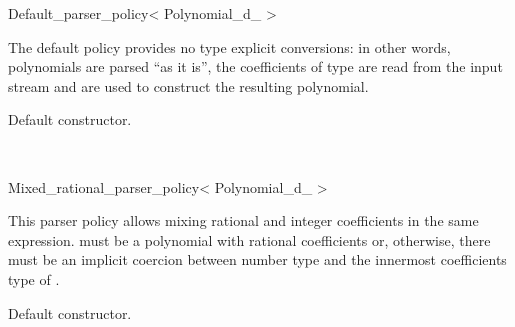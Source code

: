 \begin{ccRefClass} {Default_parser_policy< Polynomial_d_ >}

\ccDefinition
The default policy provides no type explicit conversions: in other words, polynomials are parsed ``as it is'', the coefficients of type  are read from the input stream and are used to construct the resulting polynomial.


\ccIsModel
{}

\ccTypes

\ccGlue


\ccCreation
{}

{Default constructor.}

\ccSeeAlso
{}\\


\end{ccRefClass}

\begin{ccRefClass} {Mixed_rational_parser_policy< Polynomial_d_ >}

\ccDefinition
This parser policy allows mixing rational and integer coefficients in the same expression. 
 must be a polynomial with rational coefficients or, otherwise, 
there must be an implicit coercion between  number type and
the innermost coefficients type of . 


\ccIsModel
{}

\ccInheritsFrom
{}

\ccTypes

\ccGlue
{}\ccGlue
{}\ccGlue
{}\ccGlue


\ccCreation
{}

{Default constructor.}

\ccSeeAlso
{}\\

\end{ccRefClass}


